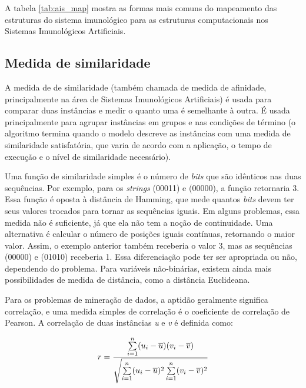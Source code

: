 A tabela \ref{tab:ais_map} mostra as formas mais comuns do mapeamento das estruturas do sistema imunológico para as estruturas computacionais nos Sistemas Imunológicos Artificiais.

\subsection{Medida de similaridade}

A medida de de similaridade (também chamada de medida de afinidade, principalmente na área de Sistemas Imunológicos Artificiais) é usada para comparar duas instâncias e medir o quanto uma é semelhante à outra. É usada principalmente para agrupar instâncias em grupos e nas condições de término (o algoritmo termina quando o modelo descreve as instâncias com uma medida de similaridade satisfatória, que varia de acordo com a aplicação, o tempo de execução e o nível de similaridade necessário).

Uma função de similaridade simples é o número de \emph{bits} que são idênticos nas duas sequências. Por exemplo, para os \emph{strings} (00011) e (00000), a função retornaria 3. Essa função é oposta à distância de Hamming, que mede quantos \emph{bits} devem ter seus valores trocados para tornar as sequências iguais. Em alguns problemas, essa medida não é suficiente, já que ela não tem a noção de continuidade. Uma alternativa é calcular o número de posições iguais contínuas, retornando o maior valor. Assim, o exemplo anterior também receberia o valor 3, mas as sequências (00000) e (01010) receberia 1. Essa diferenciação pode ter ser apropriada ou não, dependendo do problema. Para variáveis não-binárias, existem ainda mais possibilidades de medida de distância, como a distância Euclideana.

Para os problemas de mineração de dados, a aptidão geralmente significa correlação, e uma medida simples de correlação é o coeficiente de correlação de Pearson. A correlação de duas instâncias \emph{u} e \emph{v} é definida como:

\begin{equation}
    \vspace{2mm}
r=\frac{
    \sum\limits_{i=1}^{n}
        (u_i-\overline{u})
        (v_i-\overline{v})
    }
    {\sqrt{
        \sum\limits_{i=1}^{n}
            (u_i-\overline{u})^2
        \sum\limits_{i=1}^{n}
            (v_i-\overline{v})^2
        }
    }
    \vspace{2mm}
\end{equation}

